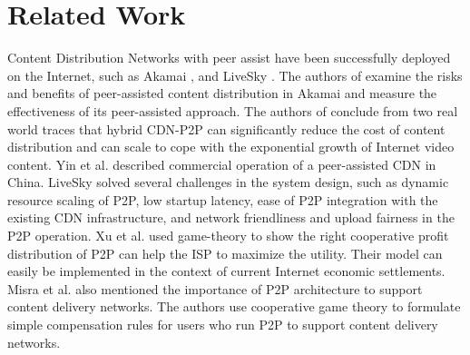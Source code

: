 \documentclass[10pt,final,journal,a4paper]{IEEEtran}
\begin{document}




\section{Related Work}\label{relatedwork}
Content Distribution Networks with peer assist have been successfully deployed on the Internet, such as Akamai \cite{Zhao:2013:PCD:2504730.2504752}, \cite{Huang:2008:UHC:1496046.1496064} and LiveSky \cite{Yin:2010:LEC:1823746.1823750}.  
The authors of \cite{Zhao:2013:PCD:2504730.2504752} examine the risks and benefits of peer-assisted content distribution in Akamai and measure the effectiveness of its peer-assisted approach. 
The authors of \cite{Huang:2008:UHC:1496046.1496064} conclude from two real world traces that hybrid CDN-P2P can significantly reduce the cost of content distribution and can scale to cope with the exponential growth of Internet video content.  
Yin et al. \cite{Yin:2010:LEC:1823746.1823750} described commercial operation of a peer-assisted CDN in China.  
LiveSky solved several challenges in the system design, such as dynamic resource scaling of P2P, low startup latency, ease of P2P integration with the existing CDN infrastructure, and network friendliness and upload fairness in the P2P operation.  
Xu et al.\cite{DBLP:journals/corr/abs-1212-4915} used game-theory to show the right cooperative profit distribution of P2P can help the ISP to maximize the utility.  
Their model can easily be implemented in the context of current Internet economic settlements.  
Misra et al.\cite{Misra:2010:IPS:1811099.1811064} also mentioned the importance of P2P architecture to support content delivery networks.
The authors use cooperative game theory to formulate simple compensation rules for users who run P2P to support content delivery networks.
\end{document}
